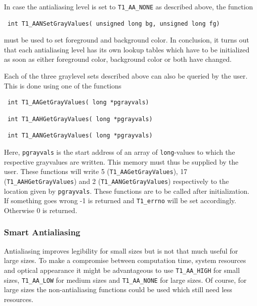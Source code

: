 In case the antialiasing level is set to \verb+T1_AA_NONE+ as described 
above, the function
\precorr
\begin{verbatim}
 int T1_AANSetGrayValues( unsigned long bg, unsigned long fg)
\end{verbatim}\postcorr
must be used to set foreground and background color. In conclusion, it turns
out that each antialiasing level has its own lookup tables which have to be
initialized as soon as either foreground color, background color or both have
changed. 
 
Each of the three graylevel sets described above can also be queried by the
user. This is done using one of the functions
\precorr
\begin{verbatim}
 int T1_AAGetGrayValues( long *pgrayvals)
\end{verbatim}\postcorr
\precorr
\begin{verbatim}
 int T1_AAHGetGrayValues( long *pgrayvals)
\end{verbatim}\postcorr
\precorr
\begin{verbatim}
 int T1_AANGetGrayValues( long *pgrayvals)
\end{verbatim}\postcorr
Here, \verb+pgrayvals+ is the start address of an array of \verb+long+-values
to which the respective grayvalues are written. This memory must thus be
supplied by the user. These functions will write 5
(\verb+T1_AAGetGrayValues+), 17 (\verb+T1_AAHGetGrayValues+) and 2
(\verb+T1_AANGetGrayValues+) respectively to the location given by
\verb+pgrayvals+. These functions are to be called after initialization. If
something goes wrong -1 is returned and \verb+T1_errno+ will be set
accordingly. Otherwise 0 is returned. 


\subsubsection{Smart Antialiasing} 
\label{smartantialiasing}%
Antialiasing improves legibility for small sizes but is not that much useful
for large sizes. To make a compromise between computation time, system
resources and optical appearance it might be advantageous to use
\verb+T1_AA_HIGH+ for small sizes, \verb+T1_AA_LOW+ for medium sizes and
\verb+T1_AA_NONE+ for large sizes. Of course, for large sizes the
non-antialiasing functions could be used which still need less resources. 

